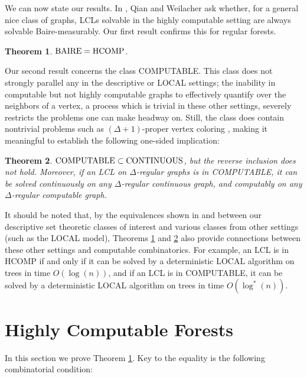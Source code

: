 \documentclass[11pt]{amsart}
\newtheorem{theorem}{Theorem}
\theoremstyle{definition}
\begin{document}
We can now state our results. In \cite{QW_ASI}, Qian and Weilacher ask whether, for a general nice class of graphs, LCLs solvable in the highly computable setting are always solvable Baire-measurably. Our first result confirms this for regular forests.

\begin{theorem}\label{th:main}
    $\textnormal{BAIRE} = \textnormal{HCOMP}$.
\end{theorem}

Our second result concerns the class COMPUTABLE. This class does not strongly parallel any in the descriptive or LOCAL settings; the inability in computable but not highly computable graphs to effectively quantify over the neighbors of a vertex, a process which is trivial in these other settings, severely restricts the problems one can make headway on. Still, the class does contain nontrivial problems such as $(\Delta+1)$-proper vertex coloring \cite{schmerl_brooks}, making it meaningful to establish the following one-sided implication:

\begin{theorem}\label{th:maincomp}
    $\textnormal{COMPUTABLE} \subset \textnormal{CONTINUOUS}$, but the reverse inclusion does not hold.  Moreover, if an LCL on $\Delta$-regular graphs is in \textnormal{COMPUTABLE}, it can be solved continuously on any $\Delta$-regular continuous graph, and computably on any $\Delta$-regular computable graph.
\end{theorem}

It should be noted that, by the equivalences shown in \cite{G+_trees} and \cite{BCG_Trees2} between our descriptive set theoretic classes of interest and various classes from other settings (such as the LOCAL model), Theorems \ref{th:main} and \ref{th:maincomp} also provide connections between these other settings and computable combinatorics. For example, an LCL is in HCOMP if and only if it can be solved by a deterministic LOCAL algorithm on trees in time $O(\log(n))$, and if an LCL is in COMPUTABLE, it can be solved by a deterministic LOCAL algorithm on trees in time $O(\log^*(n))$. 


\section{Highly Computable Forests}

In this section we prove Theorem \ref{th:main}. Key to the equality is the following combinatorial condition:
\end{document}
